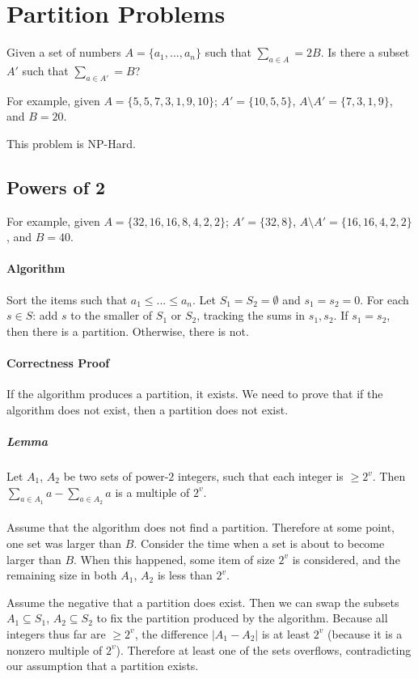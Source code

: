 \documentclass[a4paper]{article}
\begin{document}
\section{Partition Problems}
Given a set of numbers $A=\{a_1,...,a_n\}$ such that $\sum_{a\in A}=2B$. Is there a subset $A'$ such that $\sum_{a\in A'}=B$?

For example, given $A=\{5,5,7,3,1,9,10\}$; $A'=\{10,5,5\}$, $A\setminus A'=\{7,3,1,9\}$, and $B=20$.

This problem is NP-Hard.

\subsection{Powers of 2}
For example, given $A=\{32,16,16,8,4,2,2\}$; $A'=\{32,8\}$, $A\setminus A'=\{16,16,4,2,2\}$, and $B=40$.

\paragraph{Algorithm}
Sort the items such that $a_1\le ...\le a_n$.
Let $S_1=S_2=\emptyset$ and $s_1=s_2=0$.
For each $s \in S$: add $s$ to the smaller of $S_1$ or $S_2$, tracking the sums in $s_1, s_2$.
If $s_1=s_2$, then there is a partition. Otherwise, there is not.

\paragraph{Correctness Proof}
If the algorithm produces a partition, it exists. We need to prove that if the algorithm does not exist, then a partition does not exist.

\subparagraph{Lemma}
Let $A_1$, $A_2$ be two sets of power-$2$ integers, such that each integer is $\ge 2^v$. Then $\sum_{a\in A_1}a - \sum_{a\in A_2} a$ is a multiple of $2^v$.

\paragraph{}
Assume that the algorithm does not find a partition. Therefore at some point, one set was larger than $B$. Consider the time when a set is about to become larger than $B$. When this happened, some item of size $2^v$ is considered, and the remaining size in both $A_1$, $A_2$ is less than $2^v$.

Assume the negative that a partition does exist. Then we can swap the subsets $A_1\subseteq S_1$, $A_2\subseteq S_2$ to fix the partition produced by the algorithm. Because all integers thus far are $\ge 2^v$, the difference $|A_1 - A_2|$ is at least $2^v$ (because it is a nonzero multiple of $2^v$). Therefore at least one of the sets overflows, contradicting our assumption that a partition exists.
\end{document}
